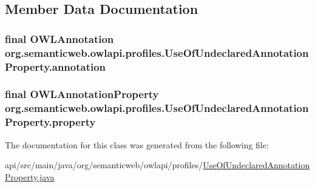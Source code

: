 \subsection{Member Data Documentation}
\hypertarget{classorg_1_1semanticweb_1_1owlapi_1_1profiles_1_1_use_of_undeclared_annotation_property_a544d987861dd59f97858bd1af742c197}{
\subsubsection[{annotation}]{\setlength{\rightskip}{0pt plus 5cm}final {\bf O\-W\-L\-Annotation} org.\-semanticweb.\-owlapi.\-profiles.\-Use\-Of\-Undeclared\-Annotation\-Property.\-annotation\hspace{0.3cm}{\ttfamily [private]}}}\label{classorg_1_1semanticweb_1_1owlapi_1_1profiles_1_1_use_of_undeclared_annotation_property_a544d987861dd59f97858bd1af742c197}
\hypertarget{classorg_1_1semanticweb_1_1owlapi_1_1profiles_1_1_use_of_undeclared_annotation_property_afb280a49727ad6c4bb51322fb1f91dc6}{
\subsubsection[{property}]{\setlength{\rightskip}{0pt plus 5cm}final {\bf O\-W\-L\-Annotation\-Property} org.\-semanticweb.\-owlapi.\-profiles.\-Use\-Of\-Undeclared\-Annotation\-Property.\-property\hspace{0.3cm}{\ttfamily [private]}}}\label{classorg_1_1semanticweb_1_1owlapi_1_1profiles_1_1_use_of_undeclared_annotation_property_afb280a49727ad6c4bb51322fb1f91dc6}


The documentation for this class was generated from the following file\-:\begin{DoxyCompactItemize}
\item 
api/src/main/java/org/semanticweb/owlapi/profiles/\hyperlink{_use_of_undeclared_annotation_property_8java}{Use\-Of\-Undeclared\-Annotation\-Property.\-java}\end{DoxyCompactItemize}
